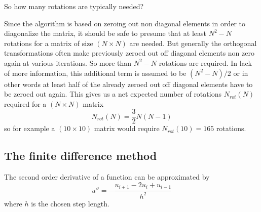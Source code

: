 \documentclass[aip,nobalancelastpage,
twocolumn,
rsi,%
 amsmath,amssymb,
 reprint,%
]{revtex4}
\begin{document}
So how many rotations are typically needed?\par 
Since the algorithm is based on zeroing out non diagonal elements in order to diagonalize the matrix, it should be safe to presume that at least $N^2 - N$ rotations for a matrix of size $(N \times N)$ are needed. But generally the orthogonal transformations often make previously zeroed out off diagonal elements non zero again at various iterations. So more than $N^2-N$ rotations are required. In lack of more information, this additional term is assumed to be $(N^2-N)/2$ or in other words at least half of the already zeroed out off diagonal elements have to be zeroed out again. This gives us a net expected number of rotations $N_{rot}(N)$ required for a $(N \times N)$ matrix 
 \begin{equation}
 \label{numberofRotequation}
 N_{rot}(N) = \frac{3}{2}N ( N-1)
 \end{equation}
so for example a $(10 \times 10)$ matrix would require $N_{rot}(10) = 165$ rotations.
\subsection{The finite difference method}
The second order derivative of a function can be approximated by
\begin{equation}
u'' = -\frac{u_{i+1} - 2u_i + u_{i-1}}{h^2}
\end{equation}
where $h$ is the chosen step length.
\end{document}
